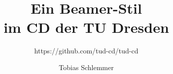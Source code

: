 \documentclass[ngerman,aspectratio=169]{beamer}%
\title{Ein Beamer-Stil\protect\\ im CD der TU Dresden}
\subtitle{https://github.com/tud-cd/tud-cd}
\author{Tobias Schlemmer}
\begin{document}
\maketitle
\begin{frame}\tiny
  
\end{frame}
\end{document}
